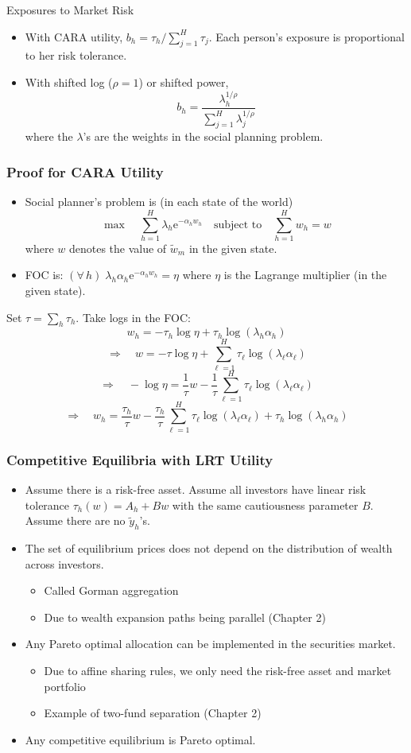 \documentclass[10pt]{beamer}
\newcommand{\bi}{\begin{itemize}}
\newcommand{\ei}{\end{itemize}}
\newcommand{\im}{\item}
\newcommand{\E}{\mathrm{e}}
\newcommand{\bfr}{\begin{frame}}
\newcommand{\tw}{\tilde{w}}
\newcommand{\ty}{\tilde{y}}
\begin{document}
  \begin{frame}{Exposures to Market Risk}
    \bi 
    \im With CARA utility, $b_h = \tau_h / \sum_{j=1}^H \tau_j$.  Each person's exposure is proportional to her risk tolerance.
  
  \im With shifted log ($\rho=1$) or shifted power,
  $$b_h =  \frac{\lambda_h^{1/\rho }}{\sum_{j=1}^H \lambda_j^{1/\rho }}$$
  where the $\lambda$'s are the weights in the social planning problem. 
  \ei
  \end{frame}
  
  \bfr\frametitle{Proof for CARA Utility}
  \bi 
  \im
  Social planner's problem is (in each state of the world)
  $$\max \quad \sum_{h=1}^H \lambda_h \E^{-\alpha_h w_h} \quad \text{subject to} \quad \sum_{h=1}^H w_h = w$$
  where $w$ denotes the value of $\tw_m$ in the given state.
 
  \im FOC is:  $(\forall\, h) \; \lambda_h\alpha_h\E^{-\alpha_hw_h} = \eta$ where $\eta$ is the Lagrange multiplier (in the given state).   
 \ei 
\end{frame} 
\begin{frame} 
  Set $\tau = \sum_h \tau_h$.   Take logs in the FOC:
  $$
  w_h =  -{\tau _h}\log \eta + \tau _h\log (\lambda_h\alpha_h)\label{3_wh}$$
  \pause
   $$ \Rightarrow \quad 
   w  = - \tau \log \eta + \sum_{\ell =1}^H \tau _\ell \log (\lambda_\ell \alpha_\ell )$$ 
   \pause $$
   \Rightarrow \quad -\log \eta  =
  \frac{1}{\tau }w - \frac{1}{\tau }\sum_{\ell =1}^H \tau _\ell \log (\lambda_\ell \alpha_\ell )$$ 
  \pause $$
   \Rightarrow \quad 
  w_h =\frac{\tau _h}{\tau }w -\frac{\tau _h}{\tau }\sum_{\ell =1}^H \tau _\ell \log (\lambda_\ell \alpha_\ell ) + \tau _h\log(\lambda_h\alpha_h)
$$
  \end{frame}
  
  \bfr\frametitle{Competitive Equilibria with LRT Utility}
  \bi
  \im Assume there is a risk-free asset.  Assume all investors have linear risk tolerance $\tau_h(w) = A_h + Bw$ with the same cautiousness parameter $B$.  Assume there are no $\ty_h$'s.
  \im The set of equilibrium prices does not depend on the distribution of wealth across investors.
  \bi
  \im Called Gorman aggregation
  \im Due to wealth expansion paths being parallel (Chapter 2)
  \ei
  \im Any Pareto optimal allocation can be implemented in the securities market.
  \bi
  \im Due to affine sharing rules, we only need the risk-free asset and market portfolio
  \im Example of two-fund separation (Chapter 2)
  \ei
  \im Any competitive equilibrium is Pareto optimal.
  \ei
  \end{frame}
  
  
\end{document}
